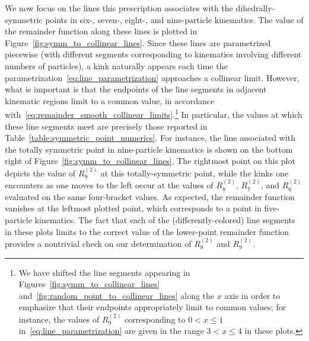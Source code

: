 \documentclass[11pt]{article}
\begin{document}
We now focus on the lines this prescription associates with the dihedrally-symmetric points in six-, seven-, eight-, and nine-particle kinematics. The value of the remainder function along these lines is plotted in Figure~\ref{fig:symm_to_collinear_lines}. Since these lines are parametrized piecewise (with different segments corresponding to kinematics involving different numbers of particles), a kink naturally appears each time the parametrization~\eqref{eq:line_parametrization} approaches a collinear limit. However, what is important is that the endpoints of the line segments in adjacent kinematic regions limit to a common value, in accordance with~\eqref{eq:remainder_smooth_collinear_limits}.\footnote{We have shifted the line segments appearing in Figures~\ref{fig:symm_to_collinear_lines} and~\ref{fig:random_point_to_collinear_lines} along the $x$ axis in order to emphasize that their endpoints appropriately limit to common values; for instance, the values of $R_9^{(2)}$\! corresponding to $0 < x \leq 1$ in~\eqref{eq:line_parametrization} are given in the range $3 < x \leq 4$ in these plots.} In particular, the values at which these line segments meet are precisely those reported in Table~\ref{table:symmetric_point_numerics}. For instance, the line associated with the totally symmetric point in nine-particle kinematics is shown on the bottom right of Figure~\ref{fig:symm_to_collinear_lines}. The rightmost point on this plot depicts the value of $R_9^{(2)}$\! at this totally-symmetric point, while the kinks one encounters as one moves to the left occur at the values of $R_8^{(2)}$\!, $R_7^{(2)}$\!, and $R_6^{(2)}$\! evaluated on the same four-bracket values. As expected, the remainder function vanishes at the leftmost plotted point, which corresponds to a point in five-particle kinematics. The fact that each of the (differently-colored) line segments in these plots limits to the correct value of the lower-point remainder function provides a nontrivial check on our determination of $R_8^{(2)}$\! and $R_9^{(2)}$\!.  
\end{document}
